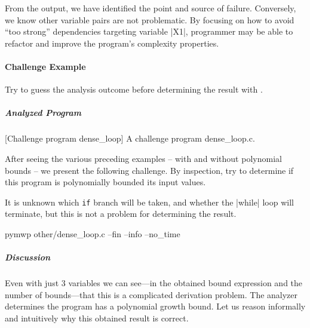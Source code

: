 From the output, we have identified the point and source of failure. Conversely,
we know other variable pairs are not problematic. By focusing on how to avoid
\enquote{too strong} dependencies targeting variable \pr|X1|, programmer may be
able to refactor and improve the program's complexity properties.

\paragraph{Challenge Example}\label{challenge-example}
Try to guess the analysis outcome before determining the result with
.

\subparagraph*{Analyzed Program}

\begin{center}
\begin{minipage}{\textwidth}
\captionsetup{type=lstlisting}
[Challenge program dense\_loop]
    {A challenge program dense\_loop.c.}
\label{lst:challange}
\end{minipage}
\end{center}

After seeing the various preceding examples -- with and without polynomial
bounds -- we present the following challenge. By inspection, try to determine if
this program is polynomially bounded \wrt its input values.

It is unknown which \texttt{if} branch will be taken, and whether the \pr|while|
loop will terminate, but this is not a problem for
determining the result.

\begin{center}
\begin{minipage}{\textwidth}
\begin{cmdlisting}[label={lst:ex5-run-cmd}]
pymwp other/dense_loop.c --fin --info --no_time
\end{cmdlisting}
\end{minipage}
\end{center}

\begin{center}
\begin{minipage}{\textwidth}
\end{minipage}
\label{lst:ex5-output}
\end{center}

\subparagraph*{Discussion}
Even with just 3 variables we can see---in the obtained bound expression and the
number of bounds---that this is a complicated derivation problem. The analyzer
determines the program has a polynomial growth bound. Let us reason informally
and intuitively why this obtained result is correct.

